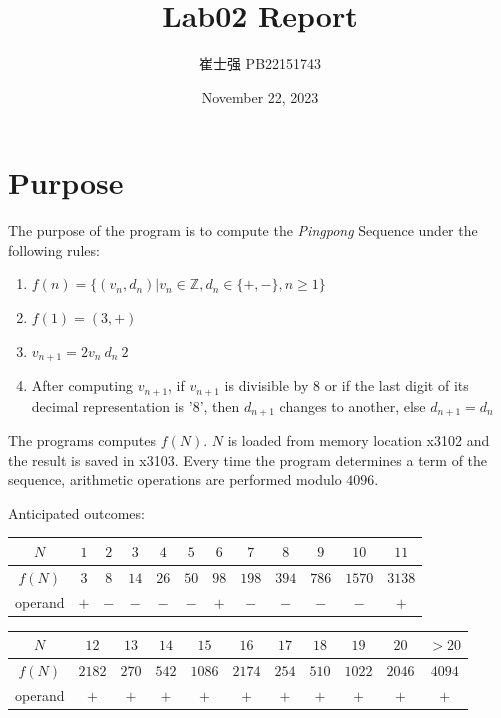 \documentclass[UTF8]{ctexart}
\title{Lab02 Report}
\author{崔士强 PB22151743}
\date{November 22, 2023}
\begin{document}
\maketitle
\section{Purpose}
The purpose of the program is to compute the \textit{Pingpong} Sequence under the following rules:
\begin{enumerate}
  \item $f(n)=\{\left(v_n, d_n\right)|v_n\in \mathbb{Z},d_n\in \{+, -\}, n\geq 1\} $
  \item $f(1)=\left(3, +\right)$
  \item $v_{n+1}=2v_n\ d_n\ 2$
  \item After computing $v_{n+1}$, if $v_{n+1}$ is divisible by 8 or if the last digit of its decimal representation is '8', then $d_{n+1}$ changes to another, else $d_{n+1}=d_n$
\end{enumerate}

The programs computes $f\left(N\right)$. $N$ is loaded from memory location x3102 and the result is saved in x3103.
Every time the program determines a term of the sequence, arithmetic operations are performed modulo $4096$.

Anticipated outcomes:
\begin{table}[h]
    \centering
    \begin{tabular}{cccccccccccc}
        \hline\hline
        $N$ & $1$ & $2$ & $3$ & $4$ & $5$ & $6$ & $7$ & $8$ & $9$ & $10$ & $11$ \\
        \hline
        $f(N)$ & $3$ & $8$ & $14$ & $26$ & $50$ & $98$ & $198$ & $394$ & $786$ & $1570$ & $3138$\\
        operand & $+$ & $-$ & $-$ & $-$ & $-$ & $+$ & $-$ & $-$ & $-$ & $-$ & $+$ \\
        \hline\hline
    \end{tabular}
\end{table}
\begin{table}[h]
    \centering
    \begin{tabular}{ccccccccccc}
        \hline\hline
        $N$ & $12$ & $13$ & $14$ & $15$ & $16$ & $17$ & $18$ & $19$ & $20$ & $>20$\\
        \hline
        $f(N)$ & $2182$ & $270$ & $542$ & $1086$ & $2174$ & $254$ & $510$ & $1022$ & $2046$ & $4094$\\
        operand & $+$ & $+$ & $+$ & $+$ & $+$ & $+$ & $+$ & $+$ & $+$ & $+$ \\
        \hline\hline
    \end{tabular}
\end{table}
\end{document}
